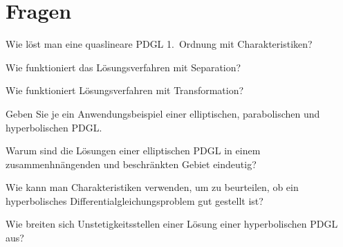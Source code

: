 \documentclass[a4paper,12pt,twocolumn]{article}
\begin{document}
\section{Fragen}
\begin{compactenum}
\item Wie löst man eine quaslineare PDGL 1.~Ordnung mit Charakteristiken?
\item Wie funktioniert das Lösungsverfahren mit Separation?
\item Wie funktioniert Lösungsverfahren mit Transformation?
\item Geben Sie je ein Anwendungsbeispiel einer elliptischen, parabolischen und
hyperbolischen PDGL.
\item Warum sind die Lösungen einer elliptischen PDGL in einem
zusammenhnängenden und beschränkten Gebiet eindeutig?
\item Wie kann man Charakteristiken verwenden, um zu beurteilen, ob ein
hyperbolisches Differentialgleichungsproblem gut gestellt ist?
\item Wie breiten sich Unstetigkeitsstellen einer Lösung einer
hyperbolischen PDGL aus?
\end{compactenum}
\vfill
\end{document}
